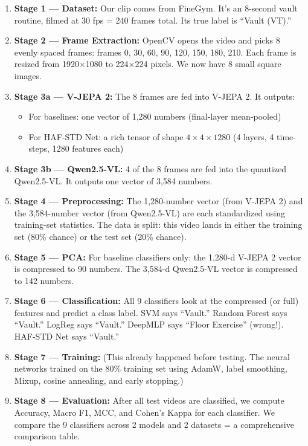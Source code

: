 \documentclass[12pt, a4paper]{article}
\begin{document}
\begin{yellowbox}
\begin{enumerate}[leftmargin=1cm, itemsep=0.5cm]
    \item \textbf{Stage 1 — Dataset:} Our clip comes from FineGym. It's an 8-second vault routine, filmed at 30 fps = 240 frames total. Its true label is ``Vault (VT).''
    
    \item \textbf{Stage 2 — Frame Extraction:} OpenCV opens the video and picks 8 evenly spaced frames: frames 0, 30, 60, 90, 120, 150, 180, 210. Each frame is resized from 1920$\times$1080 to 224$\times$224 pixels. We now have 8 small square images.
    
    \item \textbf{Stage 3a — V-JEPA 2:} The 8 frames are fed into V-JEPA 2. It outputs:
    \begin{itemize}
        \item For baselines: one vector of 1,280 numbers (final-layer mean-pooled)
        \item For HAF-STD Net: a rich tensor of shape $4 \times 4 \times 1280$ (4 layers, 4 time-steps, 1280 features each)
    \end{itemize}
    
    \item \textbf{Stage 3b — Qwen2.5-VL:} 4 of the 8 frames are fed into the quantized Qwen2.5-VL. It outputs one vector of 3,584 numbers.
    
    \item \textbf{Stage 4 — Preprocessing:} The 1,280-number vector (from V-JEPA 2) and the 3,584-number vector (from Qwen2.5-VL) are each standardized using training-set statistics. The data is split: this video lands in either the training set (80\% chance) or the test set (20\% chance).
    
    \item \textbf{Stage 5 — PCA:} For baseline classifiers only: the 1,280-d V-JEPA 2 vector is compressed to 90 numbers. The 3,584-d Qwen2.5-VL vector is compressed to 142 numbers.
    
    \item \textbf{Stage 6 — Classification:} All 9 classifiers look at the compressed (or full) features and predict a class label. SVM says ``Vault.'' Random Forest says ``Vault.'' LogReg says ``Vault.'' DeepMLP says ``Floor Exercise'' (wrong!). HAF-STD Net says ``Vault.''
    
    \item \textbf{Stage 7 — Training:} (This already happened before testing. The neural networks trained on the 80\% training set using AdamW, label smoothing, Mixup, cosine annealing, and early stopping.)
    
    \item \textbf{Stage 8 — Evaluation:} After all test videos are classified, we compute Accuracy, Macro F1, MCC, and Cohen's Kappa for each classifier. We compare the 9 classifiers across 2 models and 2 datasets = a comprehensive comparison table.
\end{enumerate}
\end{yellowbox}
\end{document}
